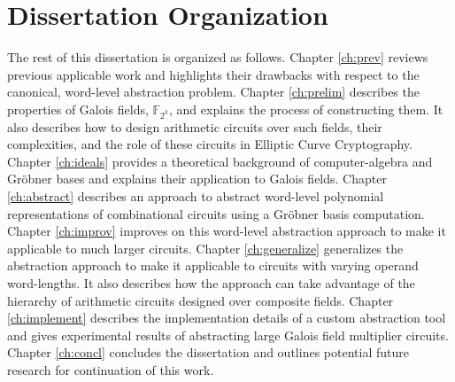 

\section{Dissertation Organization}
The rest of this dissertation is organized as follows. Chapter
\ref{ch:prev} reviews previous applicable work and highlights their
drawbacks with respect to the canonical, word-level abstraction problem. 
Chapter \ref{ch:prelim} describes the properties of Galois fields, 
$\mathbb{F}_{2^k}$, and explains the process of constructing them.
It also describes how to design arithmetic circuits over such fields, their 
complexities, and the role of these circuits in Elliptic Curve Cryptography.
Chapter \ref{ch:ideals} provides a theoretical background of 
computer-algebra and Gr\"obner bases and explains their application
to Galois fields. 
Chapter \ref{ch:abstract} describes an approach to abstract 
word-level polynomial representations of combinational circuits using a 
Gr\"obner basis computation.
Chapter \ref{ch:improv} improves on this word-level abstraction approach to 
make it applicable to much larger circuits.
Chapter \ref{ch:generalize} generalizes the abstraction approach to make
it applicable to circuits with varying operand word-lengths. It also describes how the 
approach can take advantage of the hierarchy of arithmetic circuits designed over
composite fields.
Chapter \ref{ch:implement} describes the implementation details of a 
custom abstraction tool and gives experimental results of
abstracting large Galois field multiplier circuits.
Chapter \ref{ch:concl} concludes the dissertation and outlines potential future 
research for continuation of this work. 
